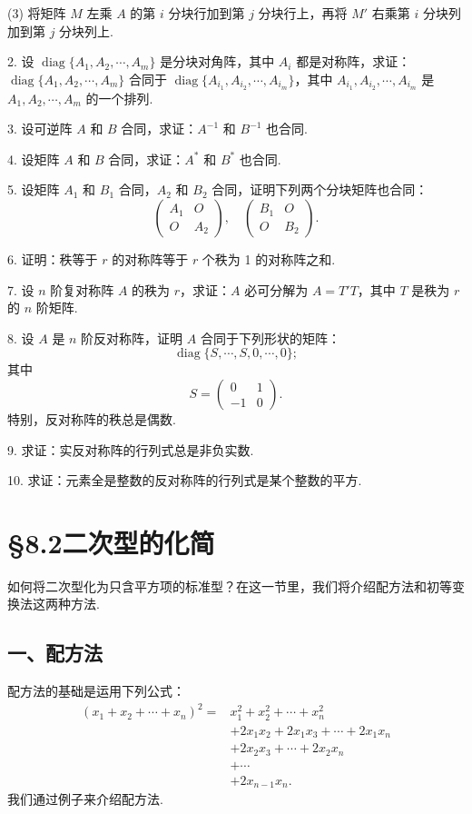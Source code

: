 \documentclass[UTF8, 12pt, fontset=fandol, oneside]{ctexart}
\begin{document}
(3) 将矩阵 $M$ 左乘 $A$ 的第 $i$ 分块行加到第 $j$ 分块行上，再将 $M'$ 右乘第 $i$ 分块列加到第 $j$ 分块列上.

2. 设 $\operatorname{diag}\{A_1,A_2,\cdots,A_m\}$ 是分块对角阵，其中 $A_i$ 都是对称阵，求证：$\operatorname{diag}\{A_1,A_2,\cdots,A_m\}$ 合同于 $\operatorname{diag}\{A_{i_1},A_{i_2},\cdots,A_{i_m}\}$，其中 $A_{i_1},A_{i_2},\cdots,A_{i_m}$ 是 $A_1,A_2,\cdots,A_m$ 的一个排列.

3. 设可逆阵 $A$ 和 $B$ 合同，求证：$A^{-1}$ 和 $B^{-1}$ 也合同.

4. 设矩阵 $A$ 和 $B$ 合同，求证：$A^*$ 和 $B^*$ 也合同.

5. 设矩阵 $A_1$ 和 $B_1$ 合同，$A_2$ 和 $B_2$ 合同，证明下列两个分块矩阵也合同：
\[
\left(\begin{array}{cc}
A_1&O\\
O&A_2
\end{array}\right),\quad
\left(\begin{array}{cc}
B_1&O\\
O&B_2
\end{array}\right).
\]

6. 证明：秩等于 $r$ 的对称阵等于 $r$ 个秩为 1 的对称阵之和.

7. 设 $n$ 阶复对称阵 $A$ 的秩为 $r$，求证：$A$ 必可分解为 $A=T'T$，其中 $T$ 是秩为 $r$ 的 $n$ 阶矩阵.

8. 设 $A$ 是 $n$ 阶反对称阵，证明 $A$ 合同于下列形状的矩阵：
\[
\operatorname{diag}\{S,\cdots,S,0,\cdots,0\};
\]
其中
\[
S=\left(\begin{array}{cc}
0&1\\
-1&0
\end{array}\right).
\]
特别，反对称阵的秩总是偶数.

9. 求证：实反对称阵的行列式总是非负实数.

10. 求证：元素全是整数的反对称阵的行列式是某个整数的平方.

\section*{§8.2\quad 二次型的化简}

如何将二次型化为只含平方项的标准型？在这一节里，我们将介绍配方法和初等变换法这两种方法.

\subsection*{一、配方法}

配方法的基础是运用下列公式：
\[
\begin{aligned}
(x_1+x_2+\cdots+x_n)^2
={}&x_1^2+x_2^2+\cdots+x_n^2\\
&+2x_1x_2+2x_1x_3+\cdots+2x_1x_n\\
&+2x_2x_3+\cdots+2x_2x_n\\
&+\cdots\\
&+2x_{n-1}x_n.
\end{aligned}
\]
我们通过例子来介绍配方法.
\end{document}
